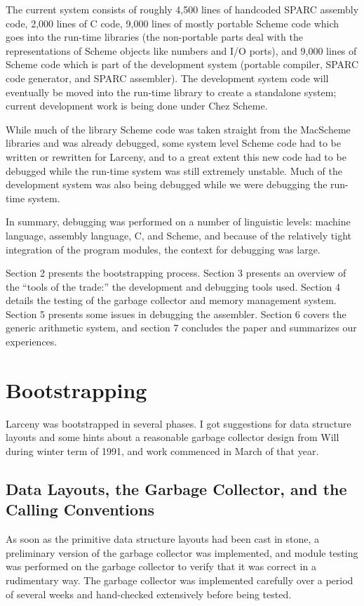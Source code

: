 The current system  consists of roughly 4,500 lines of handcoded SPARC
assembly code, 2,000 lines of C code, 9,000 lines of mostly portable Scheme
code which goes into the run-time libraries (the non-portable parts deal
with the representations of Scheme objects like numbers and I/O ports), and
9,000 lines of Scheme code which is part of the development system (portable
compiler, SPARC code generator, and SPARC assembler). The development system
code will eventually be moved into the run-time library to create a
standalone system; current development work is being done under Chez Scheme.

While much of the library Scheme code was taken straight from the
MacScheme libraries and was already debugged, some system level Scheme code
had to be written or rewritten for Larceny, and to a great extent this new code
had to be debugged while the run-time system was still extremely unstable.
Much of the development system was also being debugged while
we were debugging the
run-time system.

In summary, debugging was performed on a number of linguistic levels: machine
language, assembly language, C, and Scheme, and because of the relatively
tight integration of the program modules, the context for debugging was
large.

Section 2 presents the bootstrapping process. Section 3 presents an overview
of the ``tools of the trade:'' the development and debugging tools used.
Section 4 details the testing of the garbage collector and memory management
system. Section 5 presents some issues in debugging the assembler. Section 6
covers the generic arithmetic system, and section 7 concludes the paper and
summarizes our experiences.

\section{Bootstrapping}

Larceny was bootstrapped in several phases.  I got suggestions for data
structure layouts and some hints about a reasonable garbage collector design
from Will during winter term of 1991, and work commenced in March of
that year.

\subsection{Data Layouts, the Garbage Collector, and the Calling Conventions}

As soon as the primitive data structure layouts had been cast in stone, a
preliminary version of the garbage collector was implemented, and module
testing was performed on the garbage collector to verify that it was correct
in a rudimentary way. The garbage collector was implemented carefully over
a period of several weeks and hand-checked extensively before being tested.

